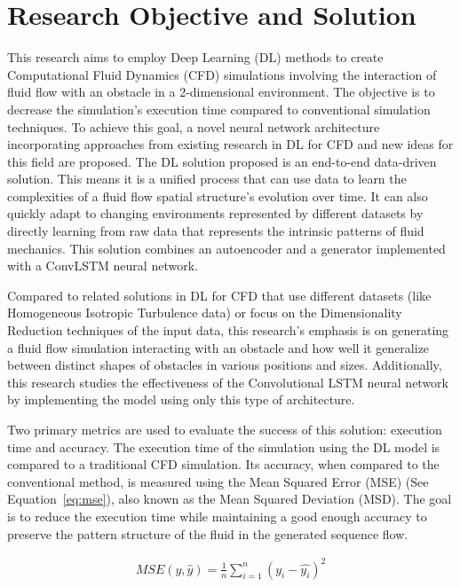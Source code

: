 \section{Research Objective and Solution}
\label{sec:ResearchObjectiveandSolution}
This research aims to employ Deep Learning (DL) methods to create Computational Fluid Dynamics (CFD) simulations involving the interaction of fluid flow with an obstacle in a 2-dimensional environment. The objective is to decrease the simulation's execution time compared to conventional simulation techniques. To achieve this goal, a novel neural network architecture incorporating approaches from existing research in DL for CFD and new ideas for this field are proposed. The DL solution proposed is an end-to-end data-driven solution. This means it is a unified process that can use data to learn the complexities of a fluid flow spatial structure's evolution over time. It can also quickly adapt to changing environments represented by different datasets by directly learning from raw data that represents the intrinsic patterns of fluid mechanics. This solution combines an autoencoder and a generator implemented with a ConvLSTM neural network.

Compared to related solutions in DL for CFD that use different datasets (like Homogeneous Isotropic Turbulence data) or focus on the Dimensionality Reduction techniques of the input data, this research's emphasis is on generating a fluid flow simulation interacting with an obstacle and how well it generalize between distinct shapes of obstacles in various positions and sizes. Additionally, this research studies the effectiveness of the Convolutional LSTM neural network by implementing the model using only this type of architecture.

Two primary metrics are used to evaluate the success of this solution: execution time and accuracy. The execution time of the simulation using the DL model is compared to a traditional CFD simulation. Its accuracy, when compared to the conventional method, is measured using the Mean Squared Error (MSE) (See Equation~\ref{eq:mse}), also known as the Mean Squared Deviation (MSD). The goal is to reduce the execution time while maintaining a good enough accuracy to preserve the pattern structure of the fluid in the generated sequence flow.

\begin{equation}
    \begin{aligned}
        MSE(y, \hat{y}) = \frac{1}{n} \sum_{i=1}^{n}(y_i-\hat{y_i})^2
    \end{aligned}
    \label{eq:mse}
\end{equation}

